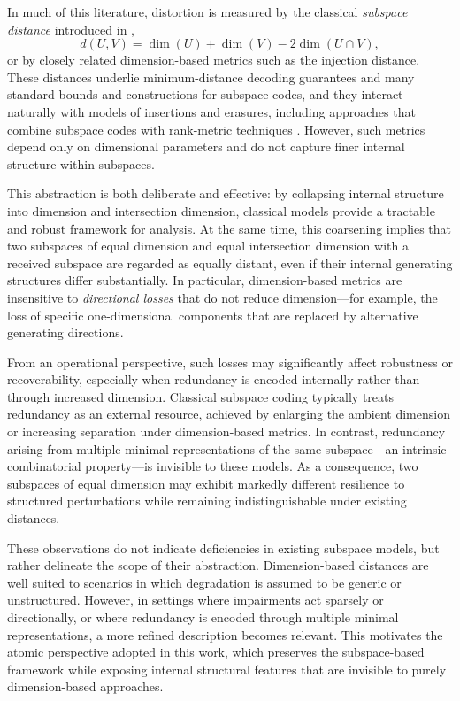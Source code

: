 \documentclass{svproc}
\begin{document}
In much of this literature, distortion is measured by the classical
\emph{subspace distance} introduced in \cite{koetter2008coding},
$$d(U,V)=\dim(U)+\dim(V)-2\dim(U\cap V),$$
or by closely related dimension-based metrics such as the injection distance.
These distances underlie minimum-distance decoding guarantees and many standard
bounds and constructions for subspace codes, and they interact naturally with
models of insertions and erasures, including approaches that combine subspace
codes with rank-metric techniques \cite{horlemann2023insertion}. However, such
metrics depend only on dimensional parameters and do not capture finer internal
structure within subspaces.

This abstraction is both deliberate and effective: by collapsing internal
structure into dimension and intersection dimension, classical models provide a
\allowbreak tractable and robust framework for analysis. At the same time, this coarsening
implies that two subspaces of equal dimension and equal intersection dimension
with a received subspace are regarded as equally distant, even if their internal
generating structures differ substantially. In particular, dimension-based
metrics are insensitive to \emph{directional losses} that do not reduce
dimension—for example, the loss of specific one-dimensional components that are
replaced by alternative generating directions.

From an operational perspective, such losses may significantly affect
robustness or recoverability, especially when redundancy is encoded internally
rather than through increased dimension. Classical subspace coding typically
treats redundancy as an external resource, achieved by enlarging the ambient
dimension or increasing separation under dimension-based metrics. In contrast,
redundancy arising from multiple minimal representations of the same subspace—an
intrinsic combinatorial property—is invisible to these models. As a consequence,
two subspaces of equal dimension may exhibit markedly different resilience to
structured perturbations while remaining indistinguishable under existing
distances.

These observations do not indicate deficiencies in existing subspace models, but
rather delineate the scope of their abstraction. Dimension-based distances are
well suited to scenarios in which degradation is assumed to be generic or
unstructured. However, in settings where impairments act sparsely or
directionally, or where redundancy is encoded through multiple minimal
representations, a more refined description becomes relevant. This motivates the
atomic perspective adopted in this work, which preserves the subspace-based
framework while exposing internal structural features that are invisible to
purely dimension-based approaches.
\end{document}
